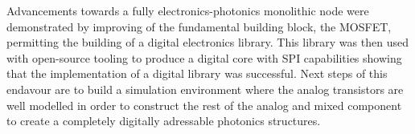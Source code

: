 Advancements towards a fully electronics-photonics monolithic node were demonstrated by improving of the fundamental building block, the MOSFET, permitting the building of a digital electronics library. 
This library was then used with open-source tooling to produce a digital core with SPI capabilities showing that the implementation of a digital library was successful.
Next steps of this endavour are to build a simulation environment where the analog transistors are well modelled in order to construct the rest of the analog and mixed component to create a completely digitally adressable photonics structures.

